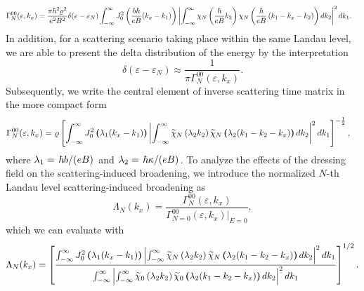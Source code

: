 \documentclass[
 reprint,
 amsmath,amssymb,
 aps,
 prb,
]{revtex4-2}
\begin{document}
\begin{widetext}
  \begin{equation} \label{eq:17}
   \begin{aligned}
     &\Gamma^{00}_{N} (\varepsilon,k_x) =
     \frac{ \pi \hbar^2 \varrho^2}{e^2B^2}
     \delta(\varepsilon - \varepsilon_{N})
     \int_{-\infty}^{\infty}
     J_0^2 \bm{\left(} \frac{b\hbar}{eB}({k}_x - k_1) \bm{\right)}
     \left|
     \int_{-\infty}^{\infty}
     \chi_N \left( \frac{\hbar}{eB}k_2 \right)
     \chi_N \bm{\left(} \frac{\hbar}{eB}
     \left( k_1 - {k}_x - k_2 \right) \bm{\right)}
     dk_2 \right|^2 d k_1.
   \end{aligned}
  \end{equation}
In addition, for a scattering scenario taking place within the same Landau level, we are able to present the delta distribution of the energy by the  interpretation \cite{dini16}
\begin{equation} \label{eq:18}
 \delta(\varepsilon - \varepsilon_{N}) \approx
 \frac{1}{\pi \Gamma^{00}_N (\varepsilon,k_x)}.
\end{equation}
Subsequently, we write the central element of inverse scattering time matrix in the more compact form
\begin{equation} \label{eq:19}
  \begin{aligned}
    &\Gamma^{00}_{N}(\varepsilon,k_x) =
     \varrho
      \left[
      \int_{-\infty}^{\infty}
      J_0^2 \bm{\left(} \lambda_1 (k_x - k_1) \bm{\right)}
      \left|
      \int_{-\infty}^{\infty}
      \widetilde{\chi}_{N}\left(\lambda_2 k_2 \right)
      \widetilde{\chi}_{N} \bm{\left(} \lambda_2 (k_1 - k_2 - k_x) \bm{\right)}
      dk_2 \right|^2
      dk_1
      \right]^{-\frac{1}{2}},
  \end{aligned}
\end{equation}
where $ \lambda_1 = \flatfrac{\hbar b}{(eB)}$ and  $\lambda_2 = \flatfrac{\hbar \kappa}{(eB)}$.
To analyze the effects of the dressing field on the scattering-induced broadening, we introduce the normalized $N$-th Landau level scattering-induced broadening as
\begin{equation} \label{eq:20}
    \Lambda_N(k_x) =
    \frac{\Gamma^{00}_N (\varepsilon,k_x)}
    {\Gamma^{00}_{N=0}(\varepsilon,k_x)\big|_{E=0}},
\end{equation}
which we can evaluate with
\begin{equation} \label{eq:21}
    \Lambda_N (k_x) =
    \left[
    \frac
    {
      \int_{-\infty}^{\infty}
      J_0^2 \bm{\left(} \lambda_1 (k_x - k_1) \bm{\right)}
      \left|
      \int_{-\infty}^{\infty}
      \widetilde{\chi}_{N}\left(\lambda_2 k_2 \right)
      \widetilde{\chi}_{N} \bm{\left(} \lambda_2 (k_1 - k_2 - k_x) \bm{\right)}
      dk_2 \right|^2
      dk_1
    }
    {
      \int_{-\infty}^{\infty}
      \left|
      \int_{-\infty}^{\infty}
      \widetilde{\chi}_0 \left(\lambda_2 k_2 \right)
      \widetilde{\chi}_0 \bm{\left(} \lambda_2 (k_1 - k_2 - k_x) \bm{\right)}
      dk_2 \right|^2
      dk_1
    }
    \right]^{1/2}.
\end{equation}
\end{widetext}
\end{document}
